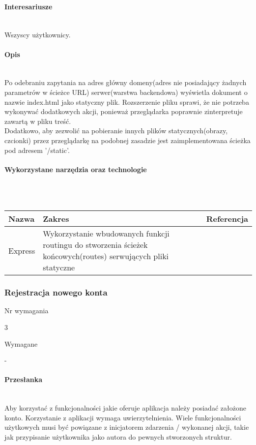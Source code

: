 \documentclass[eng,printmode]{mgr}
\begin{document}
\paragraph{Interesariusze}\ \\
Wszyscy użytkownicy.

\paragraph{Opis}\ \\
Po odebraniu zapytania na adres główny domeny(adres nie posiadający żadnych parametrów w ścieżce URL) serwer(warstwa backendowa) wyświetla dokument o nazwie index.html jako statyczny plik. Rozszerzenie pliku sprawi, że nie potrzeba wykonywać dodatkowych akcji, ponieważ przeglądarka poprawnie zinterpretuje zawartą w pliku treść. \\
Dodatkowo, aby zezwolić na pobieranie innych plików statycznych(obrazy, czcionki) przez przeglądarkę na podobnej zasadzie jest zaimplementowana ścieżka pod adresem '/static'.

\paragraph{Wykorzystane narzędzia oraz technologie}\ \\ \\
\begin{tabularx}{\textwidth}{|l|X|l|}
  \hline
    \textbf{Nazwa} & \textbf{Zakres}  & \textbf{Referencja}\\
  \hline
    Express &
    Wykorzystanie wbudowanych funkcji routingu do stworzenia ścieżek końcowych(routes) serwujących pliki statyczne &
    \cite{Express-static-routing}\\
  \hline
\end{tabularx}
\newpage

\subsubsection{Rejestracja nowego konta}
\begin{labeling}{Nr wymagania}
\item [Nr wymagania:] 3
\item [Typ:] Wymagane
\item [Powiązania:] -
\end{labeling}

\paragraph{Przesłanka}\ \\
Aby korzystać z funkcjonalności jakie oferuje aplikacja należy posiadać założone konto. Korzystanie z aplikacji wymaga uwierzytelnienia. Wiele funkcjonalności użytkowych musi być powiązane z inicjatorem zdarzenia / wykonanej akcji, takie jak przypisanie użytkownika jako autora do pewnych stworzonych struktur.
\end{document}
